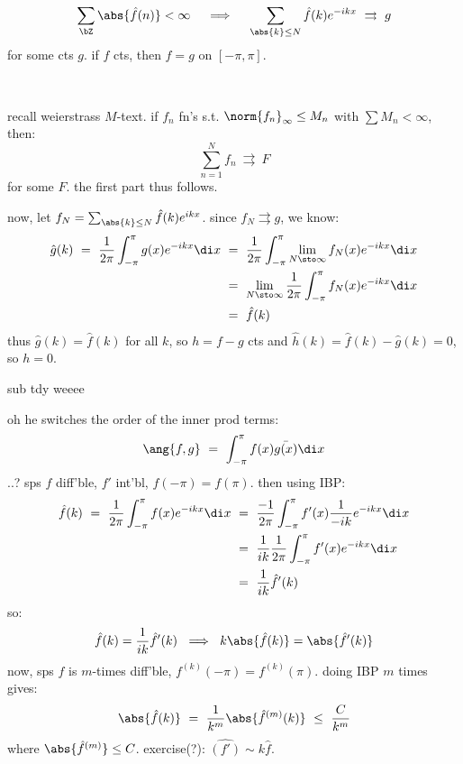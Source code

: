 \begin{crll}
	\begin{equation*}
		\sum_{\bZ}\abs{\hat{f}(n)}<\infty \quad \implies \quad
		\sum_{\abs{k}\leq N}\hat{f}(k)e^{-ikx} \ \rightrightarrows \ g
	\end{equation*}
	for some cts $g$.
	if $f$ cts, then $f=g$ on $[-\pi,\pi]$.
\end{crll} \

\begin{pf}
	recall weierstrass $M$-text.
	if $f_{n}$ fn's s.t. $\norm{f_{n}}_{\infty}\leq M_{n}$ with $\sum M_{n}<\infty$, then:
	\begin{equation*}
		\sum_{n=1}^{N}f_{n} \ \rightrightarrows \ F
	\end{equation*}
	for some $F$. the first part thus follows.

	now, let $f_{N}=\sum_{\abs{k}\leq N}\hat{f}(k)e^{ikx}$.
	since $f_{N}\rightrightarrows g$, we know:
	\begin{align*}
		\hat{g}(k) \ = \ \frac{1}{2\pi}\int_{-\pi}^{\pi}g(x)e^{-ikx}\di x
		& \ = \ \frac{1}{2\pi}\int_{-\pi}^{\pi}\lim_{N\sto\infty}f_{N}(x)e^{-ikx}\di x \\
		& \ = \ \lim_{N\sto\infty}\frac{1}{2\pi}\int_{-\pi}^{\pi}f_{N}(x)e^{-ikx}\di x \\
		& \ = \ \hat{f}(k)
	\end{align*}
	thus $\hat{g}(k)=\hat{f}(k)$ for all $k$, so $h=f-g$ cts and
	$\hat{h}(k)=\hat{f}(k)-\hat{g}(k)=0$, so $h=0$.
\end{pf}

\newpage
{}
sub tdy weeee

oh he switches the order of the inner prod terms:
\begin{equation*}
	\ang{f,g} \ = \ \int_{-\pi}^{\pi}f(x)\bar{g(x)}\di x
\end{equation*}
..? sps $f$ diff'ble, $f'$ int'bl, $f(-\pi)=f(\pi)$. then using IBP:
\begin{align*}
	\hat{f}(k) \ = \ \frac{1}{2\pi}\int_{-\pi}^{\pi}f(x)e^{-ikx}\di x
	& \ = \ \frac{-1}{2\pi}\int_{-\pi}^{\pi}f'(x)\frac{1}{-ik}e^{-ikx}\di x \\
	& \ = \ \frac{1}{ik}\frac{1}{2\pi}\int_{-\pi}^{\pi}f'(x)e^{-ikx}\di x \\
	& \ = \ \frac{1}{ik}\hat{f}'(k)
\end{align*}
so:
\begin{equation*}
	\hat{f}(k) = \frac{1}{ik}\hat{f}'(k) \ \implies \ k\abs{\hat{f}(k)} = \abs{\hat{f}'(k)}
\end{equation*}
now, sps $f$ is $m$-times diff'ble, $f^{(k)}(-\pi)=f^{(k)}(\pi)$.
doing IBP $m$ times gives:
\begin{equation*}
	\abs{\hat{f}(k)} \ = \ \frac{1}{k^{m}}\abs{\hat{f}^{(m)}(k)} \ \leq \ \frac{C}{k^{m}}
\end{equation*}
where $\abs{\hat{f}^{(m)}}\leq C$.
exercise(?): $\hat{(f')}\sim k\hat{f}$.
